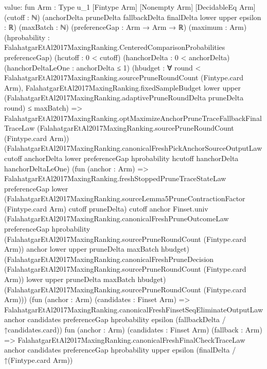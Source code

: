 \documentclass[10pt]{article}
\begin{document}
\begin{ReviewVerbatim}
value:
fun {Arm : Type u_1} [Fintype Arm] [Nonempty Arm] [DecidableEq Arm] (cutoff : ℕ)
    (anchorDelta pruneDelta fallbackDelta finalDelta lower upper epsilon : ℝ) (maxBatch : ℕ)
    (preferenceGap : Arm → Arm → ℝ) (maximum : Arm)
    (hprobability : FalahatgarEtAl2017MaxingRanking.CenteredComparisonProbabilities preferenceGap)
    (hcutoff : 0 < cutoff) (hanchorDelta : 0 < anchorDelta) (hanchorDeltaLeOne : anchorDelta ≤ 1)
    (hbudget :
      ∀ round < FalahatgarEtAl2017MaxingRanking.sourcePruneRoundCount (Fintype.card Arm),
        FalahatgarEtAl2017MaxingRanking.fixedSampleBudget lower upper
            (FalahatgarEtAl2017MaxingRanking.adaptivePruneRoundDelta pruneDelta round) ≤
          maxBatch) =>
  FalahatgarEtAl2017MaxingRanking.optMaximizeAnchorPruneTraceFallbackFinalTraceLaw
    (FalahatgarEtAl2017MaxingRanking.sourcePruneRoundCount (Fintype.card Arm))
    (FalahatgarEtAl2017MaxingRanking.canonicalFreshPickAnchorSourceOutputLaw cutoff anchorDelta lower preferenceGap
      hprobability hcutoff hanchorDelta hanchorDeltaLeOne)
    (fun (anchor : Arm) =>
      FalahatgarEtAl2017MaxingRanking.freshStoppedPruneTraceStateLaw preferenceGap lower
        (FalahatgarEtAl2017MaxingRanking.sourceLemma5PruneContractionFactor (Fintype.card Arm) cutoff pruneDelta) cutoff
        anchor Finset.univ
        (FalahatgarEtAl2017MaxingRanking.canonicalFreshPruneOutcomeLaw preferenceGap hprobability
          (FalahatgarEtAl2017MaxingRanking.sourcePruneRoundCount (Fintype.card Arm)) anchor lower upper pruneDelta
          maxBatch hbudget)
        (FalahatgarEtAl2017MaxingRanking.canonicalFreshPruneDecision
          (FalahatgarEtAl2017MaxingRanking.sourcePruneRoundCount (Fintype.card Arm)) lower upper pruneDelta maxBatch
          hbudget)
        (FalahatgarEtAl2017MaxingRanking.sourcePruneRoundCount (Fintype.card Arm)))
    (fun (anchor : Arm) (candidates : Finset Arm) =>
      FalahatgarEtAl2017MaxingRanking.canonicalFreshFinsetSeqEliminateOutputLaw anchor candidates preferenceGap
        hprobability epsilon (fallbackDelta / ↑candidates.card))
    fun (anchor : Arm) (candidates : Finset Arm) (fallback : Arm) =>
    FalahatgarEtAl2017MaxingRanking.canonicalFreshFinalCheckTraceLaw anchor candidates preferenceGap hprobability upper
      epsilon (finalDelta / ↑(Fintype.card Arm))
\end{ReviewVerbatim}
\end{document}
